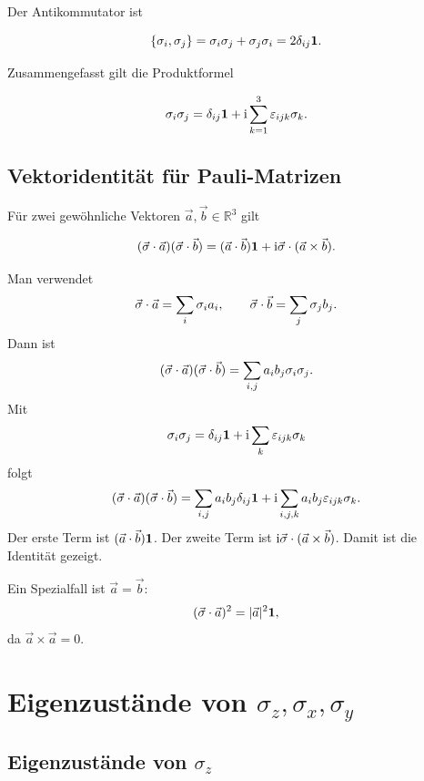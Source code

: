 Der Antikommutator ist
\begin{formulabox}
\[
    \{\sigma_i,\sigma_j\}
    =\sigma_i\sigma_j+\sigma_j\sigma_i
    =2\delta_{ij}\mathbf{1}.
\]
\end{formulabox}

Zusammengefasst gilt die Produktformel
\begin{formulabox}
\[
    \sigma_i\sigma_j
    =\delta_{ij}\mathbf{1}+\mathrm{i}\sum_{k=1}^3\varepsilon_{ijk}\sigma_k.
\]
\end{formulabox}

\subsection{Vektoridentität für Pauli-Matrizen}

Für zwei gewöhnliche Vektoren \(\vec a,\vec b\in\mathbb R^3\) gilt
\begin{formulabox}
\[
    (\vec\sigma\cdot\vec a)(\vec\sigma\cdot\vec b)
    = (\vec a\cdot\vec b)\mathbf{1}
    +\mathrm{i}\vec\sigma\cdot(\vec a\times\vec b).
\]
\end{formulabox}

\begin{derivationbox}
Man verwendet
\[
    \vec\sigma\cdot\vec a=\sum_i\sigma_i a_i,
    \qquad
    \vec\sigma\cdot\vec b=\sum_j\sigma_j b_j.
\]
Dann ist
\[
    (\vec\sigma\cdot\vec a)(\vec\sigma\cdot\vec b)
    =\sum_{i,j}a_i b_j\sigma_i\sigma_j.
\]
Mit
\[
    \sigma_i\sigma_j=\delta_{ij}\mathbf{1}+\mathrm{i}\sum_k\varepsilon_{ijk}\sigma_k
\]
folgt
\[
    (\vec\sigma\cdot\vec a)(\vec\sigma\cdot\vec b)
    =\sum_{i,j}a_i b_j\delta_{ij}\mathbf{1}
    +\mathrm{i}\sum_{i,j,k}a_i b_j\varepsilon_{ijk}\sigma_k.
\]
Der erste Term ist \((\vec a\cdot\vec b)\mathbf{1}\). Der zweite Term ist \(\mathrm{i}\vec\sigma\cdot(\vec a\times\vec b)\). Damit ist die Identität gezeigt.
\end{derivationbox}

Ein Spezialfall ist \(\vec a=\vec b\):
\[
    (\vec\sigma\cdot\vec a)^2
    =|\vec a|^2\mathbf{1},
\]
da \(\vec a\times\vec a=0\).

\section{Eigenzustände von \texorpdfstring{\(\sigma_z,\sigma_x,\sigma_y\)}{sigma z, sigma x, sigma y}}

\subsection{Eigenzustände von \(\sigma_z\)}

